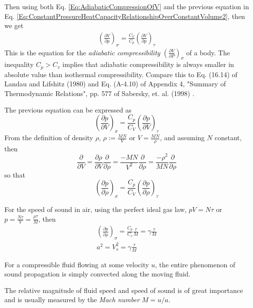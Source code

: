 \documentclass[twoside,landscape,10pt]{amsart}
\theoremstyle{plain}
\theoremstyle{definition}
\theoremstyle{remark}
\theoremstyle{remark}
\begin{document}
\begin{multicols*}{2}
Then using both Eq. \ref{Eq:AdiabaticCompressionOfV} and the previous equation in Eq. \ref{Eq:ConstantPressureHeatCapacityRelationshipOverConstantVolume2}, then we get 
\begin{equation}
\begin{gathered}
\boxed{ \left( \frac{\partial V}{\partial p }\right)_{\sigma} = \frac{C_V}{C_p} \left( \frac{\partial V}{\partial p } \right)_{\tau} }
\end{gathered}
\end{equation}
This is the equation for the \emph{adiabatic compressibility} $\left( \frac{\partial V}{ \partial P} \right)_{\sigma}$ of a body. The inequality $C_p > C_v$ implies that adiabatic compressibility is always smaller in absolute value than isothermal compressibility. Compare this to Eq. (16.14) of Landau and Lifshitz (1980) and Eq. (A-4.10) of Appendix 4, "Summary of Thermodynamic Relations", pp. 577 of Sabersky, et. al. (1998) \cite{SAHG1998}.

The previous equation can be expressed as 
\[
\left(\frac{\partial p}{\partial V }\right)_{\sigma} = \frac{C_p}{C_V} \left( \frac{\partial p}{\partial V } \right)_{\tau} 
\]
From the definition of density $\rho$, $\rho := \frac{MN}{V}$ or $V = \frac{MN}{\rho}$, and assuming $N$ constant, then
\[
\frac{\partial}{\partial V} = \frac{\partial \rho}{\partial V} \frac{\partial }{\partial \rho} = \frac{-MN}{V^2} \frac{\partial}{\partial \rho} = \frac{-\rho^2}{MN} \frac{\partial }{\partial \rho}
\]
so that 
\[
\left(\frac{\partial p}{\partial \rho }\right)_{\sigma} = \frac{C_p}{C_V} \left( \frac{\partial p}{\partial \rho  } \right)_{\tau} 
\]

For the speed of sound in air, using the perfect ideal gas law, $pV = N\tau$ or $p = \frac{N\tau}{V} = \frac{\rho \tau}{M}$, then
\[
\begin{gathered} 
\left(\frac{ \partial p }{ \partial \rho} \right)_{\sigma} = \frac{C_p}{C_v} \frac{\tau}{M} = \gamma \frac{\tau}{M} \\
a^2 = V_s^2 = \gamma \frac{\tau}{M}
\end{gathered} 
\]

For a compressible fluid flowing at some velocity $u$, the entire phenomenon of sound propagation is simply convected along the moving fluid.

The relative magnitude of fluid speed and speed of sound is of great importance and is usually measured by the \emph{Mach number} $M = u/a$. 


\end{multicols*}
\end{document}
